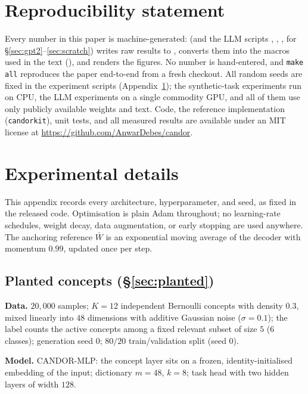 \documentclass[11pt]{article}
\providecommand{\nIn}{48}\providecommand{\nConcepts}{12}\providecommand{\nRelevant}{5}
\providecommand{\nClasses}{6}\providecommand{\dictM}{48}\providecommand{\topK}{8}
\begin{document}
\section*{Reproducibility statement}
Every number in this paper is machine-generated: 
(and the LLM scripts , ,
,  for
\S\ref{sec:gpt2}--\ref{sec:scratch}) writes raw results to
,  converts them into the
macros used in the text (), and
 renders the figures. No number is hand-entered, and
\texttt{make all} reproduces the paper end-to-end from a fresh checkout. All random
seeds are fixed in the experiment scripts (Appendix~\ref{app:details}); the
synthetic-task experiments run on CPU, the LLM experiments on a single commodity
GPU, and all of them use only publicly available weights and text. Code, the reference
implementation (\texttt{candorkit}), unit tests, and all measured results are available
under an MIT license at \url{https://github.com/AnwarDebes/candor}.



\appendix

\section{Experimental details}
\label{app:details}
This appendix records every architecture, hyperparameter, and seed, as fixed in the
released code. Optimisation is plain Adam throughout; no learning-rate schedules,
weight decay, data augmentation, or early stopping are used anywhere. The anchoring
reference $\bar W$ is an exponential moving average of the decoder with momentum
$0.99$, updated once per step.

\subsection{Planted concepts (\S\ref{sec:planted})}
\textbf{Data.} $20{,}000$ samples; $K=\nConcepts$ independent Bernoulli concepts with
density $0.3$, mixed linearly into $\nIn$ dimensions with additive Gaussian noise
($\sigma=0.1$); the label counts the active concepts among a fixed relevant subset of
size $\nRelevant$ ($\nClasses$ classes); generation seed $0$; $80/20$ train/validation
split (seed $0$).

\textbf{Model.} CANDOR-MLP: the concept layer sits on a frozen, identity-initialised
embedding of the input; dictionary $m=\dictM$, $k=\topK$; task head with two hidden
layers of width $128$.
\end{document}
